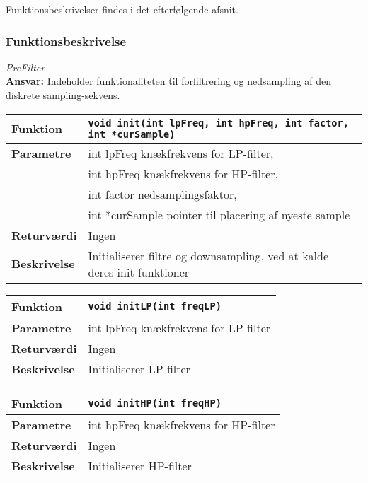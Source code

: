 Funktionsbeskrivelser findes i det efterfølgende afsnit. 

\subsubsection*{Funktionsbeskrivelse}

\textit{PreFilter} \\
\textbf{Ansvar:} Indeholder funktionaliteten til forfiltrering og nedsampling af den diskrete sampling-sekvens.


\begin{center}
    \begin{tabular}{ | l | p{} |}
    \hline
    \textbf{Funktion}	& \verb+void init(int lpFreq, int hpFreq, int factor, int *curSample) +						\\ \hline
    \textbf{Parametre} 	& int lpFreq knækfrekvens for LP-filter,\\&
    						  int hpFreq knækfrekvens for HP-filter,\\&
    						  int factor nedsamplingsfaktor, \\&
    						  int *curSample pointer til placering af nyeste sample		\\ \hline
    \textbf{Returværdi}	& Ingen																				\\ \hline
    \textbf{Beskrivelse}	& Initialiserer filtre og downsampling, ved at kalde deres init-funktioner		\\ \hline
    \end{tabular}
\end{center}

\begin{center}
    \begin{tabular}{ | l | p{} |}
    \hline
    \textbf{Funktion}	& \verb+void initLP(int freqLP) +						\\ \hline
    \textbf{Parametre} 	& int lpFreq knækfrekvens for LP-filter		\\ \hline
    \textbf{Returværdi}	& Ingen 								\\ \hline
    \textbf{Beskrivelse}	& Initialiserer LP-filter		\\ \hline
    \end{tabular}
\end{center}

\begin{center}
    \begin{tabular}{ | l | p{} |}
    \hline
    \textbf{Funktion}	& \verb+void initHP(int freqHP) +						\\ \hline
    \textbf{Parametre} 	& int hpFreq knækfrekvens for HP-filter		\\ \hline
    \textbf{Returværdi}	& Ingen 								\\ \hline
    \textbf{Beskrivelse}	& Initialiserer HP-filter		\\ \hline
    \end{tabular}
\end{center}

